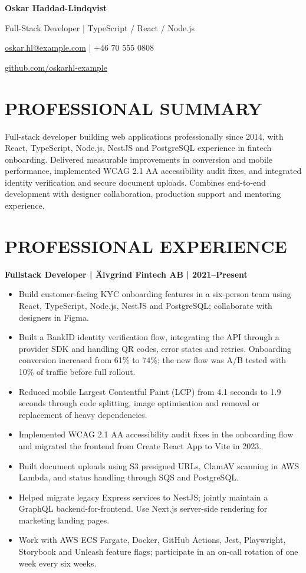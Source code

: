 \documentclass[11pt,a4paper]{article}
\newcommand{\cvsection}[1]{\section*{#1}}
\newcommand{\cvrole}[1]{\par\noindent\textbf{#1}\par}
\begin{document}
{\LARGE\bfseries\color{primarycolor} Oskar Haddad-Lindqvist}\par
{\large Full-Stack Developer | TypeScript / React / Node.js}\par
\href{mailto:oskar.hl@example.com}{oskar.hl@example.com} | +46 70 555 0808\par
\href{https://github.com/oskarhl-example}{github.com/oskarhl-example}

\cvsection{PROFESSIONAL SUMMARY}
Full-stack developer building web applications professionally since 2014, with React, TypeScript, Node.js, NestJS and PostgreSQL experience in fintech onboarding. Delivered measurable improvements in conversion and mobile performance, implemented WCAG 2.1 AA accessibility audit fixes, and integrated identity verification and secure document uploads. Combines end-to-end development with designer collaboration, production support and mentoring experience.

\cvsection{PROFESSIONAL EXPERIENCE}
\cvrole{Fullstack Developer | Älvgrind Fintech AB | 2021–Present}
\begin{itemize}
\item Build customer-facing KYC onboarding features in a six-person team using React, TypeScript, Node.js, NestJS and PostgreSQL; collaborate with designers in Figma.
\item Built a BankID identity verification flow, integrating the API through a provider SDK and handling QR codes, error states and retries. Onboarding conversion increased from 61\% to 74\%; the new flow was A/B tested with 10\% of traffic before full rollout.
\item Reduced mobile Largest Contentful Paint (LCP) from 4.1 seconds to 1.9 seconds through code splitting, image optimisation and removal or replacement of heavy dependencies.
\item Implemented WCAG 2.1 AA accessibility audit fixes in the onboarding flow and migrated the frontend from Create React App to Vite in 2023.
\item Built document uploads using S3 presigned URLs, ClamAV scanning in AWS Lambda, and status handling through SQS and PostgreSQL.
\item Helped migrate legacy Express services to NestJS; jointly maintain a GraphQL backend-for-frontend. Use Next.js server-side rendering for marketing landing pages.
\item Work with AWS ECS Fargate, Docker, GitHub Actions, Jest, Playwright, Storybook and Unleash feature flags; participate in an on-call rotation of one week every six weeks.
\end{itemize}
\end{document}

